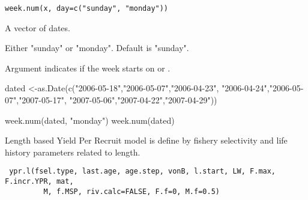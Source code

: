 \documentclass[a4paper]{book}
\begin{document}
%
\begin{Usage}
\begin{verbatim}
week.num(x, day=c("sunday", "monday"))
\end{verbatim}
\end{Usage}
%
\begin{Arguments}
\begin{ldescription}
\item[\code{x}] 
A vector of dates.

\item[\code{day}] 
Either "sunday" or "monday". Default is "sunday".

\end{ldescription}
\end{Arguments}
%
\begin{Details}\relax
Argument  indicates if the week starts on  or .
\end{Details}
%
\begin{Examples}
\begin{ExampleCode}
dated <-as.Date(c("2006-05-18","2006-05-07","2006-04-23",
                  "2006-04-24","2006-05-07","2007-05-17",
                  "2007-05-06","2007-04-22","2007-04-29"))
                  
week.num(dated, "monday")
week.num(dated)
\end{ExampleCode}
\end{Examples}
\newpage
{}
%
\begin{Description}\relax
Length based Yield Per Recruit model is define by fishery selectivity and life history parameters related to length. 


\end{Description}
%
\begin{Usage}
\begin{verbatim}
 ypr.l(fsel.type, last.age, age.step, vonB, l.start, LW, F.max, F.incr.YPR, mat, 
         M, f.MSP, riv.calc=FALSE, F.f=0, M.f=0.5)
\end{verbatim}
\end{Usage}
%
\end{document}

